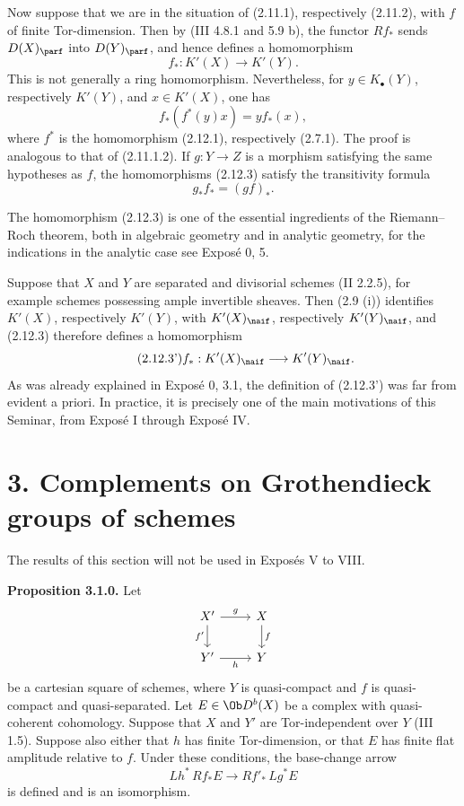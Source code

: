Now suppose that we are in the situation of (2.11.1), respectively (2.11.2), with \(f\) of finite Tor-dimension. Then by (III 4.8.1 and 5.9 b), the functor \(Rf_*\) sends \(D(X)_{\parf}\) into \(D(Y)_{\parf}\), and hence defines a homomorphism
\begin{equation}\tag{2.12.3}
 f_*:K'(X)\longrightarrow K'(Y).
\end{equation}
This is not generally a ring homomorphism. Nevertheless, for \(y\in K_{\bullet}(Y)\), respectively \(K'(Y)\), and \(x\in K'(X)\), one has
\begin{equation}\tag{2.12.4}
 f_*(f^*(y)x)=y f_*(x),
\end{equation}
where \(f^*\) is the homomorphism (2.12.1), respectively (2.7.1). The proof is analogous to that of (2.11.1.2). If \(g:Y\to Z\) is a morphism satisfying the same hypotheses as \(f\), the homomorphisms (2.12.3) satisfy the transitivity formula
\begin{equation}\tag{2.12.3.1}
 g_*f_*=(gf)_*.
\end{equation}

The homomorphism (2.12.3) is one of the essential ingredients of the Riemann--Roch theorem, both in algebraic geometry and in analytic geometry, for the indications in the analytic case see Exposé 0, 5.

Suppose that \(X\) and \(Y\) are separated and divisorial schemes (II 2.2.5), for example schemes possessing ample invertible sheaves. Then (2.9 (i)) identifies \(K'(X)\), respectively \(K'(Y)\), with \(K'(X)_{\naif}\), respectively \(K'(Y)_{\naif}\), and (2.12.3) therefore defines a homomorphism
\begin{equation}\tag{2.12.3'}
 f_*:K'(X)_{\naif}\longrightarrow K'(Y)_{\naif}.
\end{equation}
As was already explained in Exposé 0, 3.1, the definition of (2.12.3') was far from evident a priori. In practice, it is precisely one of the main motivations of this Seminar, from Exposé I through Exposé IV.

\section*{3. Complements on Grothendieck groups of schemes}

The results of this section will not be used in Exposés V to VIII.

\textbf{Proposition 3.1.0.} Let
\[
\begin{tikzcd}
X' \arrow[r,"g"]\arrow[d,"f'"'] & X\arrow[d,"f"]\\
Y' \arrow[r,"h"'] & Y
\end{tikzcd}
\]
be a cartesian square of schemes, where \(Y\) is quasi-compact and \(f\) is quasi-compact and quasi-separated. Let \(E\in\Ob D^b(X)\) be a complex with quasi-coherent cohomology. Suppose that \(X\) and \(Y'\) are Tor-independent over \(Y\) (III 1.5). Suppose also either that \(h\) has finite Tor-dimension, or that \(E\) has finite flat amplitude relative to \(f\). Under these conditions, the base-change arrow
\[
 Lh^*\,Rf_*E\longrightarrow Rf'_*\,Lg^*E
\]
is defined and is an isomorphism.

